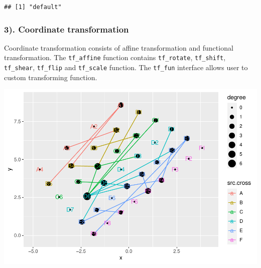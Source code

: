 \documentclass[
]{article}
\newenvironment{Shaded}{\begin{snugshade}}{\end{snugshade}}
\newcommand{\CommentTok}[1]{\textcolor[rgb]{0.56,0.35,0.01}{\textit{#1}}}
\newcommand{\DataTypeTok}[1]{\textcolor[rgb]{0.13,0.29,0.53}{#1}}
\newcommand{\DecValTok}[1]{\textcolor[rgb]{0.00,0.00,0.81}{#1}}
\newcommand{\KeywordTok}[1]{\textcolor[rgb]{0.13,0.29,0.53}{\textbf{#1}}}
\newcommand{\NormalTok}[1]{#1}
\newcommand{\OperatorTok}[1]{\textcolor[rgb]{0.81,0.36,0.00}{\textbf{#1}}}
\newcommand{\StringTok}[1]{\textcolor[rgb]{0.31,0.60,0.02}{#1}}
\begin{document}
\begin{Shaded}
\end{Shaded}

\begin{verbatim}
## [1] "default"
\end{verbatim}

\hypertarget{coordinate-transformation}{%
\subsubsection{3). Coordinate
transformation}\label{coordinate-transformation}}

Coordinate transformation consists of affine transformation and
functional transformation. The \texttt{tf\_affine} function contains
\texttt{tf\_rotate}, \texttt{tf\_shift}, \texttt{tf\_shear},
\texttt{tf\_flip} and \texttt{tf\_scale} function. The \texttt{tf\_fun}
interface allows user to custom transforming function.

\begin{Shaded}
\end{Shaded}

\includegraphics{ReadMe1_files/figure-latex/unnamed-chunk-6-1.pdf}
\end{document}
